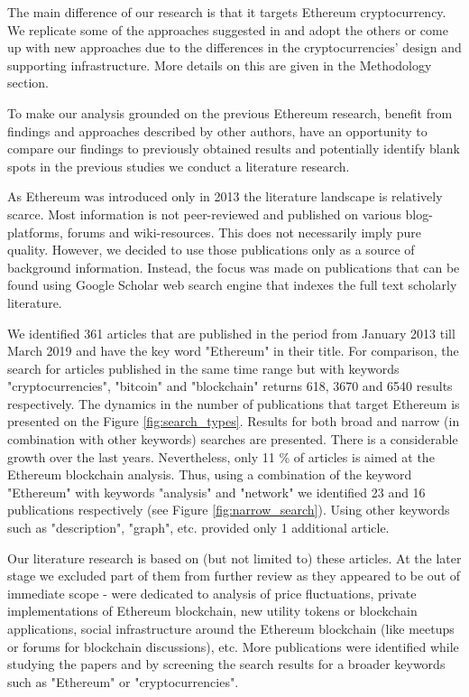 The main difference of our research is that it targets Ethereum cryptocurrency.
We replicate some of the approaches suggested in \cite{lischke2016analyzing} and adopt the others or come up with new approaches due to the differences in the cryptocurrencies' design and supporting infrastructure.
More details on this are given in the Methodology section.

To make our analysis grounded on the previous Ethereum research, benefit from findings and approaches described by other authors, have an opportunity to compare our findings to previously obtained results and potentially identify blank spots in the previous studies we conduct a literature research. 

As Ethereum was introduced only in 2013 the literature landscape is relatively scarce.
Most information is not peer-reviewed and published on various blog-platforms, forums and wiki-resources.
This does not necessarily imply pure quality.
However, we decided to use those publications only as a source of background information.
Instead, the focus was made on publications that can be found using Google Scholar web search engine that indexes the full text scholarly literature.

We identified 361 articles that are published in the period from January 2013 till March 2019 and have the key word "Ethereum" in their title. 
For comparison, the search for articles published in the same time range but with keywords "cryptocurrencies", "bitcoin" and "blockchain" returns 618, 3670 and 6540 results respectively.
The dynamics in the number of publications that target Ethereum is presented on the Figure \ref{fig:search_types}.
Results for both broad and narrow (in combination with other keywords) searches are presented.
There is a considerable growth over the last years.
Nevertheless, only 11 \% of articles is aimed at the Ethereum blockchain analysis.
Thus, using a combination of the keyword "Ethereum" with keywords "analysis" and "network" we identified 23 and 16 publications respectively (see Figure \ref{fig:narrow_search}).
Using other keywords such as "description", "graph", etc. provided only 1 additional article. 


Our literature research is based on (but not limited to) these articles.
At the later stage we excluded part of them from further review as they appeared to be out of immediate scope - were dedicated to analysis of price fluctuations, private implementations of Ethereum blockchain, new utility tokens or blockchain applications, social infrastructure around the Ethereum blockchain (like meetups or forums for blockchain discussions), etc.
More publications were identified while studying the papers and by screening the search results for a broader keywords such as "Ethereum" or "cryptocurrencies".

